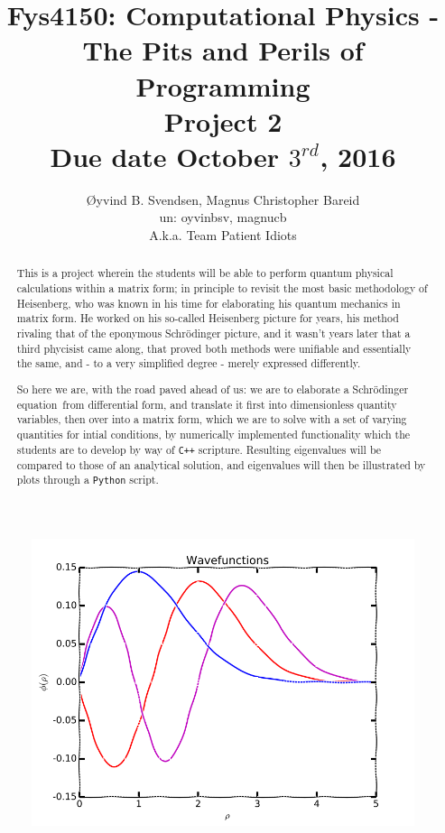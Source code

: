 \documentclass[11pt,a4paper,notitlepage]{article}
\title{\normalsize Fys4150: Computational Physics - The Pits and Perils of Programming \\
\vspace{10mm}
\huge Project 2\\
\vspace{10mm}
\normalsize Due date {\bf October $3^{rd}$, 2016}}
\author{Øyvind B. Svendsen, Magnus Christopher Bareid \\ un: oyvinbsv, magnucb \\ A.k.a. Team Patient Idiots}
\newcommand{\SE}{Schr\"odinger equation}
\begin{document}
\noindent
\maketitle
\vspace{5mm}

\begin{figure}[H]
	\centering	
	\includegraphics[scale=0.45]{frontpage.png}
\end{figure}

\begin{abstract}
This is a project wherein the students will be able to perform quantum physical calculations within a matrix form; in principle to revisit the most basic methodology of Heisenberg, who was known in his time for elaborating his quantum mechanics in matrix form. He worked on his so-called Heisenberg picture for years, his method rivaling that of the eponymous Schrödinger picture, and it wasn't years later that a third phycisist came along, that proved both methods were unifiable and essentially the same, and - to a very simplified degree - merely expressed differently.

So here we are, with the road paved ahead of us: we are to elaborate a \SE\ from differential form, and translate it first into dimensionless quantity variables, then over into a matrix form, which we are to solve with a set of varying quantities for intial conditions, by numerically implemented functionality which the students are to develop by way of \verb|C++| scripture. Resulting eigenvalues will be compared to those of an analytical solution, and eigenvalues will then be illustrated by plots through a \verb|Python| script.
\end{abstract}
\end{document}
